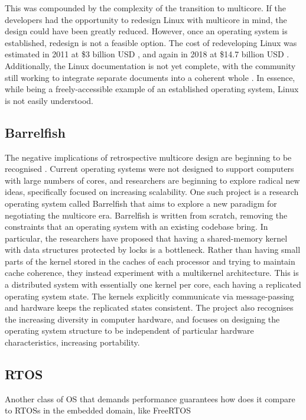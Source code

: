 \documentclass[bsc,frontabs,singlespacing,parskip,deptreport]{infthesis}
\begin{document}
This was compounded by the complexity of the transition to multicore. If the developers had the opportunity to redesign Linux with multicore in mind, the design could have been greatly reduced. However, once an operating system is established, redesign is not a feasible option. The cost of redeveloping Linux was estimated in 2011 at \$3 billion USD \cite{linux-kernel-cost}, and again in 2018 at \$14.7 billion USD \cite{cost-to-redev}. Additionally, the Linux documentation is not yet complete, with the community still working to integrate separate documents into a coherent whole \cite{linux-docs}. In essence, while being a freely-accessible example of an established operating system, Linux is not easily understood.

\subsection{Barrelfish}
The negative implications of retrospective multicore design are beginning to be recognised \cite{barrelfish-article}. Current operating systems were not designed to support computers with large numbers of cores, and researchers are beginning to explore radical new ideas, specifically focused on increasing scalability. One such project is a research operating system called Barrelfish \cite{barrelfish-website} that aims to explore a new paradigm for negotiating the multicore era. Barrelfish is written from scratch, removing the constraints that an operating system with an existing codebase bring. In particular, the researchers have proposed that having a shared-memory kernel with data structures protected by locks is a bottleneck. Rather than having small parts of the kernel stored in the caches of each processor and trying to maintain cache coherence, they instead experiment with a multikernel architecture. This is a distributed system with essentially one kernel per core, each having a replicated operating system state. The kernels explicitly communicate via message-passing and hardware keeps the replicated states consistent. The project also recognises the increasing diversity in computer hardware, and focuses on designing the operating system structure to be independent of particular hardware characteristics, increasing portability. 

\subsection{RTOS}
Another class of OS that demands performance guarantees
how does it compare to RTOSs in the embedded domain, like FreeRTOS
\end{document}
